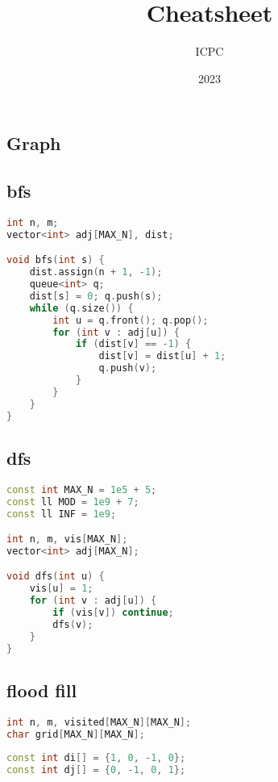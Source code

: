 \documentclass{article}
\title{Cheatsheet}
\date{2023}
\author{ICPC}
\begin{document}
\maketitle
\begin{multicols}{2}\section{Graph}
\subsection{bfs}
\lstset {    language=C++,
    basicstyle=\small\ttfamily,
    numbers=left,
    breaklines=true,
    tabsize=4}
\begin{lstlisting}[linewidth=\columnwidth,breaklines=true,language=C++]
int n, m;
vector<int> adj[MAX_N], dist;

void bfs(int s) {
    dist.assign(n + 1, -1);
    queue<int> q;
    dist[s] = 0; q.push(s);
    while (q.size()) {
        int u = q.front(); q.pop();
        for (int v : adj[u]) {
            if (dist[v] == -1) {
                dist[v] = dist[u] + 1;
                q.push(v);
            }
        }
    }
}
\end{lstlisting}
\subsection{dfs}
\lstset {    language=C++,
    basicstyle=\small\ttfamily,
    numbers=left,
    breaklines=true,
    tabsize=4}
\begin{lstlisting}[linewidth=\columnwidth,breaklines=true,language=C++]
const int MAX_N = 1e5 + 5;
const ll MOD = 1e9 + 7;
const ll INF = 1e9;

int n, m, vis[MAX_N];
vector<int> adj[MAX_N];

void dfs(int u) {
    vis[u] = 1;
    for (int v : adj[u]) {
        if (vis[v]) continue;
        dfs(v);
    }
}
\end{lstlisting}
\subsection{flood fill}
\lstset {    language=C++,
    basicstyle=\small\ttfamily,
    numbers=left,
    breaklines=true,
    tabsize=4}
\begin{lstlisting}[linewidth=\columnwidth,breaklines=true,language=C++]
int n, m, visited[MAX_N][MAX_N];
char grid[MAX_N][MAX_N];
 
const int di[] = {1, 0, -1, 0};
const int dj[] = {0, -1, 0, 1};
 

\end{lstlisting}
\end{multicols}
\end{document}
